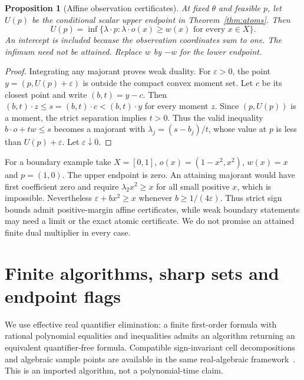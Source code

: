 \documentclass[11pt,a4paper]{article}
\numberwithin{equation}{section}
\newtheorem{proposition}[theorem]{Proposition}
\theoremstyle{definition}
\begin{document}
\begin{proposition}[Affine observation certificates]\label{prop:dual}
At fixed $\theta$ and feasible $p$, let $U(p)$ be the conditional scalar
upper endpoint in Theorem~\ref{thm:atoms}. Then
\begin{equation}\label{eq:dual}
 U(p)=\inf\{\lambda\cdot p:\lambda\cdot o(x)\ge w(x)
                                      \text{ for every }x\in X\}.
\end{equation}
An intercept is included because the observation coordinates sum to one.
The infimum need not be attained. Replace $w$ by $-w$ for the lower endpoint.
\end{proposition}
\begin{proof}
Integrating any majorant proves weak duality. For $\varepsilon>0$, the
point $y=(p,U(p)+\varepsilon)$ is outside the compact convex moment set.
Let $c$ be its closest point and write $(b,t)=y-c$. Then
$(b,t)\cdot z\le s=(b,t)\cdot c<(b,t)\cdot y$ for every moment $z$.
Since $(p,U(p))$ is a moment, the strict separation implies $t>0$.
Thus the valid inequality $b\cdot o+t w\le s$ becomes a majorant
with $\lambda_j=(s-b_j)/t$, whose value at $p$ is less than
$U(p)+\varepsilon$. Let $\varepsilon\downarrow0$.
\end{proof}

For a boundary example take $X=[0,1]$, $o(x)=(1-x^2,x^2)$, $w(x)=x$
and $p=(1,0)$. The upper endpoint is zero. An attaining majorant would
have first coefficient zero and require $\lambda_2x^2\ge x$ for all
small positive $x$, which is impossible. Nevertheless
$\varepsilon+b x^2\ge x$ whenever $b\ge1/(4\varepsilon)$.
Thus strict sign bounds admit positive-margin affine certificates, while
weak boundary statements may need a limit or the exact atomic certificate.
We do not promise an attained finite dual multiplier in every case.

\section{Finite algorithms, sharp sets and endpoint flags}\label{sec:algorithm}

We use effective real quantifier elimination: a finite first-order formula
with rational polynomial equalities and inequalities admits an algorithm
returning an equivalent quantifier-free formula. Compatible sign-invariant
cell decompositions and algebraic sample points are available in the same
real-algebraic framework~\cite[Sections 2.1, 2.2 and Theorem 2.27]{Basu}.
This is an imported algorithm, not a polynomial-time claim.
\end{document}
